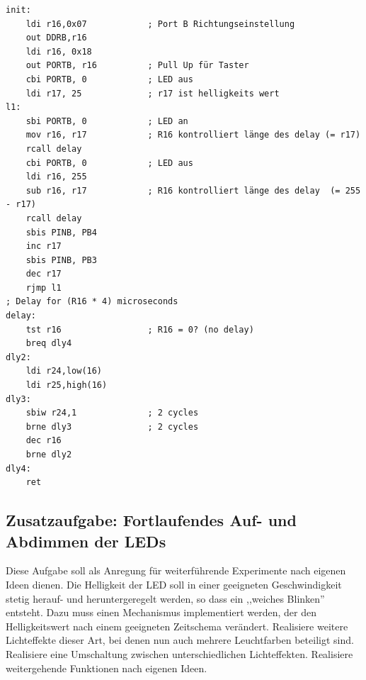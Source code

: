 \documentclass[a4paper,12pt,titlepage]{scrartcl}
\begin{document}
\begin{lstlisting}[basicstyle=\tiny]
init:
    ldi r16,0x07            ; Port B Richtungseinstellung
    out DDRB,r16
    ldi r16, 0x18
    out PORTB, r16          ; Pull Up für Taster
    cbi PORTB, 0            ; LED aus  
    ldi r17, 25             ; r17 ist helligkeits wert
l1:     
    sbi PORTB, 0            ; LED an
    mov r16, r17            ; R16 kontrolliert länge des delay (= r17)
    rcall delay             
    cbi PORTB, 0            ; LED aus
    ldi r16, 255
    sub r16, r17            ; R16 kontrolliert länge des delay  (= 255 - r17)
    rcall delay             
    sbis PINB, PB4
    inc r17
    sbis PINB, PB3
    dec r17
    rjmp l1
; Delay for (R16 * 4) microseconds
delay:  
    tst r16                 ; R16 = 0? (no delay)
    breq dly4
dly2:       
    ldi r24,low(16)
    ldi r25,high(16)
dly3:       
    sbiw r24,1              ; 2 cycles
    brne dly3               ; 2 cycles
    dec r16
    brne dly2
dly4:       
    ret
\end{lstlisting}

\newpage
\subsection*{Zusatzaufgabe: Fortlaufendes Auf- und Abdimmen der LEDs}
Diese Aufgabe soll als Anregung für weiterführende Experimente nach eigenen Ideen dienen. Die Helligkeit der LED soll in einer geeigneten Geschwindigkeit stetig herauf- und heruntergeregelt werden, so dass ein ,,weiches Blinken'' entsteht. Dazu muss einen Mechanismus implementiert werden, der den Helligkeitswert nach einem geeigneten Zeitschema verändert.
Realisiere weitere Lichteffekte dieser Art, bei denen nun auch mehrere Leuchtfarben beteiligt sind.
Realisiere eine Umschaltung zwischen unterschiedlichen Lichteffekten.
Realisiere weitergehende Funktionen nach eigenen Ideen.
\end{document}

